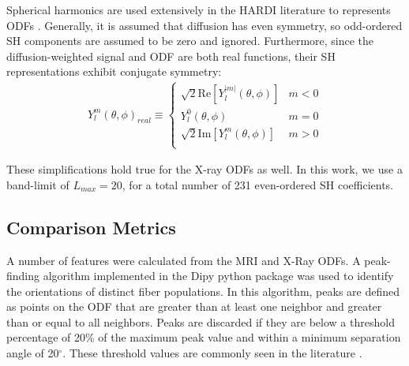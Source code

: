 \documentclass[11pt]{article}
\begin{document}
Spherical harmonics are used extensively in the HARDI literature to represents
ODFs \cite{Tournier2004}. Generally, it is assumed that diffusion has even
symmetry, so odd-ordered SH components are assumed to be zero and
ignored. Furthermore, since the diffusion-weighted signal and ODF are both real
functions, their SH representations exhibit conjugate symmetry:
\begin{align}
  Y_{l}^m(\theta, \phi)_{real} \equiv
  \begin{cases}
    \sqrt{2}\text{Re}\left[Y_l^{|m|}(\theta, \phi)\right] & m < 0\\
    Y_l^0(\theta, \phi) & m = 0\\
    \sqrt{2}\text{Im}\left[Y_l^m(\theta, \phi)\right] & m > 0\\
  \end{cases}
  \label{eq:real_Y}
\end{align}

These simplifications hold true for the X-ray ODFs as well. In this work, we use a
band-limit of $L_{max} = 20$, for a total number of 231 even-ordered SH coefficients. 

\subsection{Comparison Metrics}
A number of features were calculated from the MRI and X-Ray ODFs. A peak-finding
algorithm implemented in the Dipy python package \cite{Garyfallidis2014} was
used to identify the orientations of distinct fiber populations. In this
algorithm, peaks are defined as points on the ODF that are greater than at least
one neighbor and greater than or equal to all neighbors. Peaks are discarded if
they are below a threshold percentage of 20\% of the maximum peak value and
within a minimum separation angle of 20$^{\circ}$. These threshold values are
commonly seen in the literature \cite{Daducci2014, Schilling2018}.
\end{document}
